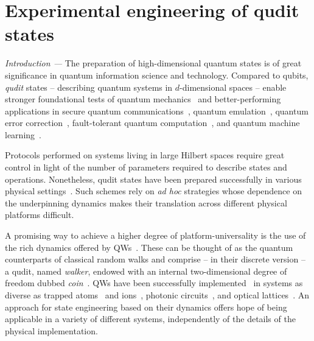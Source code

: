 \chapter{Experimental engineering of qudit states}

\textit{Introduction ---}
The preparation of high-dimensional quantum states is of great significance in quantum information science and technology. 
Compared to qubits, \textit{qudit} states -- describing quantum systems in $d$-dimensional spaces --
enable stronger foundational tests of quantum mechanics~\cite{vértesi2010closing,brunner2014bell, lapkiewicz2011experimental} and better-performing applications in secure quantum communications~\cite{bechmannpasquinucci2000quantum, fitzi2001quantum, cerf2002security, bru2002optimal, acin2003security, langford2004measuring}, quantum emulation~\cite{buluta2009quantum,neeley2009emulation}, quantum error correction~\cite{chuang1997bosonic,duclos-cianci2013kitaev,michael2016class}, fault-tolerant quantum computation~\cite{bartlett2002quantum, ralph2007efficient,lanyon2008simplifying,campbell2012magicstate,campbell2014enhanced}, and quantum machine learning~\cite{schuld2014introduction,dunjko2017machine,biamonte2017quantum}. 

Protocols performed on systems living in large Hilbert spaces require great control in light of the number of parameters required to describe states and operations. Nonetheless, qudit states have been prepared successfully in various physical settings~\cite{leibfried1996experimental,hofheinz2009synthesizing,neeley2009emulation,walborn2006quantum,lima2011experimental,rossi2009multipath,dada2011experimental,anderson2015accurate,heeres2017implementing,rosenblum2018cnot,chu2018creation}. Such schemes rely on \textit{ad hoc} strategies whose dependence on the underpinning dynamics makes their translation across different physical platforms difficult. 

A promising way to achieve a higher degree of platform-universality is the use of the rich dynamics offered by \acp{QW}~\cite{aharonov1993quantum,kempe2003quantum, venegasandraca2012quantum}. These can be thought of as the quantum counterparts of classical random walks and comprise -- in their discrete version -- a qudit, named \emph{walker}, endowed with an internal two-dimensional degree of freedom dubbed \emph{coin}~\cite{ambainis2001onedimensional}. \acp{QW} have been successfully implemented~\cite{manouchehri2014physical} in systems as diverse as trapped atoms~\cite{cote2006quantum} and ions~\cite{schmitz2009quantum,zhringer2010realization}, photonic circuits~\cite{perets2008realization,peruzzo2010quantum,broome2010discrete,schreiber2010photons,rohde2011multi,sansoni2012twoparticle,boutari2016large,cardano2015quantum,cardano2016statistical,caruso2016fast}, and optical lattices~\cite{meinert2014observation}. An approach for state engineering based on their dynamics offers hope of being applicable in a variety of different systems, independently of the details of the physical implementation.


